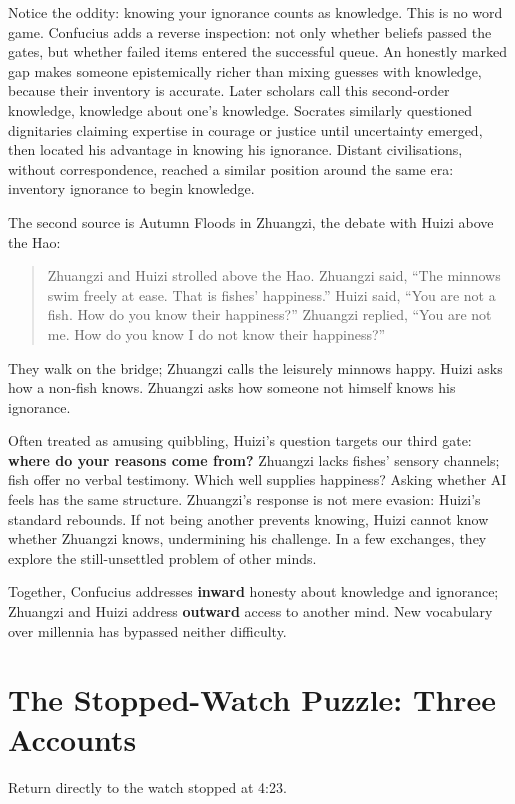 Notice the oddity: knowing your ignorance counts as knowledge. This is no word game. Confucius adds a reverse inspection: not only whether beliefs passed the gates, but whether failed items entered the successful queue. An honestly marked gap makes someone epistemically richer than mixing guesses with knowledge, because their inventory is accurate. Later scholars call this second-order knowledge, knowledge about one's knowledge. Socrates similarly questioned dignitaries claiming expertise in courage or justice until uncertainty emerged, then located his advantage in knowing his ignorance. Distant civilisations, without correspondence, reached a similar position around the same era: inventory ignorance to begin knowledge.

The second source is Autumn Floods in Zhuangzi, the debate with Huizi above the Hao:

\begin{quote}
Zhuangzi and Huizi strolled above the Hao. Zhuangzi said, ``The minnows swim freely at ease. That is fishes' happiness.'' Huizi said, ``You are not a fish. How do you know their happiness?'' Zhuangzi replied, ``You are not me. How do you know I do not know their happiness?''
\end{quote}
They walk on the bridge; Zhuangzi calls the leisurely minnows happy. Huizi asks how a non-fish knows. Zhuangzi asks how someone not himself knows his ignorance.

Often treated as amusing quibbling, Huizi's question targets our third gate: \textbf{where do your reasons come from?} Zhuangzi lacks fishes' sensory channels; fish offer no verbal testimony. Which well supplies happiness? Asking whether AI feels has the same structure. Zhuangzi's response is not mere evasion: Huizi's standard rebounds. If not being another prevents knowing, Huizi cannot know whether Zhuangzi knows, undermining his challenge. In a few exchanges, they explore the still-unsettled problem of other minds.

Together, Confucius addresses \textbf{inward} honesty about knowledge and ignorance; Zhuangzi and Huizi address \textbf{outward} access to another mind. New vocabulary over millennia has bypassed neither difficulty.

\section{The Stopped-Watch Puzzle: Three Accounts}
Return directly to the watch stopped at 4:23.

